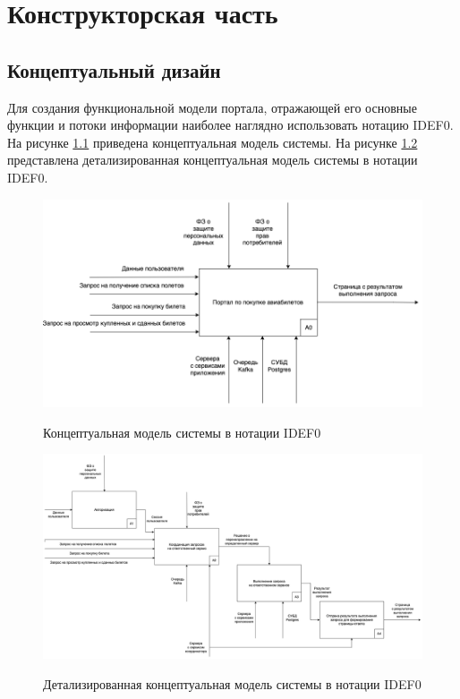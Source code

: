 \chapter{Конструкторская часть}

\section{Концептуальный дизайн}
Для создания функциональной модели портала, отражающей его основные функции и потоки информации наиболее наглядно использовать нотацию IDEF0. На рисунке \ref{fig:idef0-0} приведена концептуальная модель системы. На рисунке \ref{fig:idef0-1} представлена детализированная концептуальная модель системы в нотации IDEF0.

\begin{figure}[h!]
	\begin{center}
		{\includegraphics[scale = 0.5, angle=0]{img/idef0/idef0-0.png}}
		\caption{Концептуальная модель системы в нотации IDEF0}
		\label{fig:idef0-0}
	\end{center}
\end{figure}


\begin{figure}[h!]
	\begin{center}
		{\includegraphics[scale = 0.4, angle=90]{img/idef0/idef0-1.png}}
		\caption{Детализированная концептуальная модель системы в нотации IDEF0}
		\label{fig:idef0-1}
	\end{center}
\end{figure}


